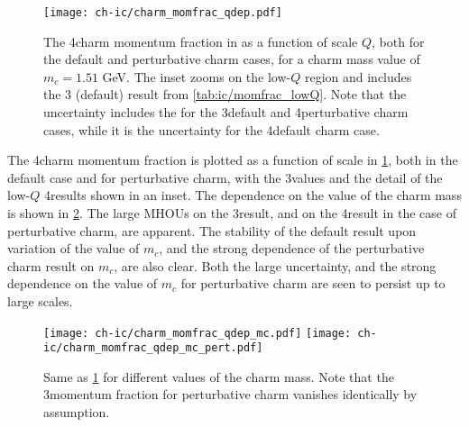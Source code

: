 \begin{figure}[h]
  \begin{center}
     \texttt{[image: ch-ic/charm\_momfrac\_qdep.pdf]}
    \caption{\small 
      The 4\fns charm momentum fraction in  as a function of scale $Q$,
      both for the default and perturbative charm cases,
      for a charm mass value of $m_c=1.51$ GeV.
     The inset zooms on the low-$Q$ region and includes the 3\fns
     (default) result
     from \cref{tab:ic/momfrac_lowQ}. 
     Note that the uncertainty includes the \mhou for the 3\fns default
     and 4\fns perturbative charm cases, while it is the \pdf
     uncertainty for the 4\fns default charm case.
  \label{fig:ic/comparison_IC_models} }
\end{center}
\end{figure}

The 4\fns charm momentum fraction is plotted as a function of scale
in \cref{fig:ic/comparison_IC_models}, both in the default case and
for perturbative charm, with the 3\fns values and the detail of the low-$Q$ 
4\fns results shown in an inset.
%
The dependence on the value of the charm mass
is shown in \cref{fig:ic/charm_momfrac_qdep_mc}.
The large MHOUs on the 3\fns result, and on the 
4\fns result in the case of perturbative charm, are apparent.
The stability of the default result upon variation of  the value of
$m_c$, and the strong dependence of the perturbative charm result on
$m_c$, are  also clear.
Both the large \mhou uncertainty, and the strong dependence on
the value of $m_c$
for perturbative charm are seen to persist up to large scales.


\begin{figure}[t]
  \begin{center}
    \texttt{[image: ch-ic/charm\_momfrac\_qdep\_mc.pdf]}
    \texttt{[image: ch-ic/charm\_momfrac\_qdep\_mc\_pert.pdf]}
    \caption{\small
    Same as \cref{fig:ic/comparison_IC_models} for different values
    of the charm mass. Note that the 3\fns momentum fraction for
     perturbative charm vanishes identically by assumption.
   \label{fig:ic/charm_momfrac_qdep_mc} }
\end{center}
\end{figure}

